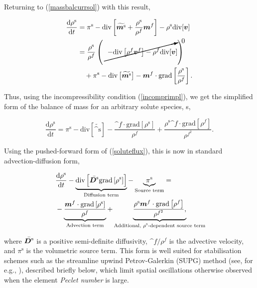 \noindent Returning to (\ref{massbalcurrsol}) with this result,

\begin{equation}
\begin{split}
\frac{\mathrm{d}\rho^\mathrm{s}}{\mathrm{d}t} &= \pi^\mathrm{s}-
\mathrm{div} \left[\widetilde{\bm^\mathrm{s}}+
\frac{\rho^\mathrm{s}}{\rho^f}\bm^f\right] - \rho^\mathrm{s}
\mathrm{div}[\bv]\\ &= \frac{\rho^\mathrm{s}}{\rho^f}\left(\cancelto{0}
{-\mathrm{div}\left[\rho^f \bv^{f}\right] - \rho^f
\mathrm{div}[\bv]}\right)\\ &\quad{} + \pi^\mathrm{s} -
\mathrm{div}\left[\widetilde{\bm^\mathrm{s}}\right]
-\bm^f\cdot\mathrm{grad}\left[\frac{ \rho^\mathrm{s}}{\rho^f}\right].\\
\end{split}
\end{equation}

Thus, using the incompressibility condition (\ref{incomprimpl}), we
get the simplified form of the balance of mass for an arbitrary solute
species, s,

\begin{equation}
\frac{\mathrm{d}\rho^\mathrm{s}}{\mathrm{d}t}=\pi^\mathrm{s} -
\mathrm{div}\left[\widetilde{\bm^\mathrm{s}}\right] -
\frac{\bm^f\cdot\mathrm{grad}\left[\rho^\mathrm{s}\right]}{\rho^f} +
\frac{\rho^\mathrm{s} \bm^f \cdot \mathrm{grad}\left[\rho^f\right]}
{\rho^{f^2}}.
\label{stdform}
\end{equation}

\noindent Using the pushed-forward form of (\ref{soluteflux}), this is
now in standard advection-diffusion form, 

\begin{equation}
\begin{split}
& \frac{\mathrm{d}\rho^\mathrm{s}}{\mathrm{d}t} - \underbrace{
 \mathrm{div}\left[\bar{\mbox{\boldmath$ D$}^\mathrm{s}} \mathrm{grad}
 \left[ \rho^\mathrm{s}\right]\right]}_\text{Diffusion term}
 - \underbrace{\pi^\mathrm{s}}_\text{Source term} =
\\ \ & - \underbrace{\frac{\mbox{\boldmath$ m$}^f\cdot\mathrm{grad}\left[\rho^\mathrm{s}\right]}{\rho^f}}
_\text{Advection term} +
\underbrace{ \frac{\rho^\mathrm{s} \mbox{\boldmath$ m$}^f \cdot \mathrm{grad}\left[\rho^f\right]}
     {\rho^{f^2}},}_\text{Additional, $\rho^\mathrm{s}$-dependent source term}
\end{split}
\label{morestdform}
\end{equation}

\noindent where $\bar{\mbox{\boldmath$ D$}^\mathrm{s}}$ is a positive semi-definite
diffusivity, $\bm^{f}/\rho^{f}$ is the advective velocity, and $
\pi^\mathrm{s}$ is the volumetric source term. This form is well
suited for stabilisation schemes such as the streamline upwind
Petrov-Galerkin (SUPG) method (see, for e.g., \cite{Paper6}), described
briefly below, which limit spatial oscillations otherwise observed
when the element {\em Peclet number} is large.

